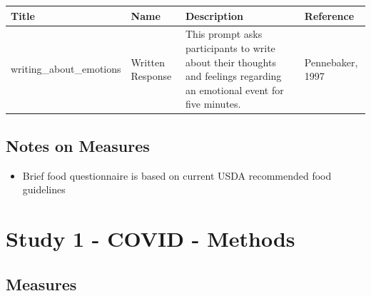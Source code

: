 \documentclass[]{book}
\providecommand{\tightlist}{%
  \setlength{\itemsep}{0pt}\setlength{\parskip}{0pt}}
\begin{document}
\begin{longtable}[]{@{}llll@{}}
\toprule
\begin{minipage}[b]{0.22\columnwidth}\raggedright
Title\strut
\end{minipage} & \begin{minipage}[b]{0.27\columnwidth}\raggedright
Name\strut
\end{minipage} & \begin{minipage}[b]{0.22\columnwidth}\raggedright
Description\strut
\end{minipage} & \begin{minipage}[b]{0.18\columnwidth}\raggedright
Reference\strut
\end{minipage}\tabularnewline
\midrule
\endhead
\begin{minipage}[t]{0.22\columnwidth}\raggedright
writing\_about\_emotions\strut
\end{minipage} & \begin{minipage}[t]{0.27\columnwidth}\raggedright
Written Response\strut
\end{minipage} & \begin{minipage}[t]{0.22\columnwidth}\raggedright
This prompt asks participants to write about their thoughts and feelings regarding an emotional event for five minutes.\strut
\end{minipage} & \begin{minipage}[t]{0.18\columnwidth}\raggedright
Pennebaker, 1997\strut
\end{minipage}\tabularnewline
\bottomrule
\end{longtable}

\hypertarget{notes-on-measures}{%
\section{Notes on Measures}\label{notes-on-measures}}

\begin{itemize}
\tightlist
\item
  Brief food questionnaire is based on current USDA recommended food guidelines
\end{itemize}

\hypertarget{study-1---covid---methods-1}{%
\chapter{Study 1 - COVID - Methods}\label{study-1---covid---methods-1}}

\hypertarget{measures-1}{%
\section{Measures}\label{measures-1}}
\end{document}
